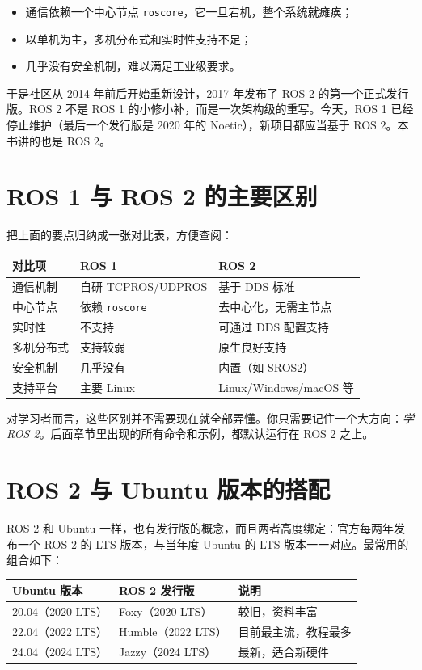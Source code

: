 \documentclass[12pt,a4paper]{ctexbook}
\begin{document}
\begin{itemize}
    \item 通信依赖一个中心节点 \texttt{roscore}，它一旦宕机，整个系统就瘫痪；
    \item 以单机为主，多机分布式和实时性支持不足；
    \item 几乎没有安全机制，难以满足工业级要求。
\end{itemize}

于是社区从 2014 年前后开始重新设计，2017 年发布了 ROS 2 的第一个正式发行版。ROS 2 不是 ROS 1 的小修小补，而是一次架构级的重写。今天，ROS 1 已经停止维护（最后一个发行版是 2020 年的 Noetic），新项目都应当基于 ROS 2。本书讲的也是 ROS 2。

\section{ROS 1 与 ROS 2 的主要区别}

把上面的要点归纳成一张对比表，方便查阅：

\begin{center}
\begin{tabular}{|l|l|l|}
\hline
\textbf{对比项} & \textbf{ROS 1} & \textbf{ROS 2} \\
\hline
通信机制 & 自研 TCPROS/UDPROS & 基于 DDS 标准 \\
中心节点 & 依赖 \texttt{roscore} & 去中心化，无需主节点 \\
实时性 & 不支持 & 可通过 DDS 配置支持 \\
多机分布式 & 支持较弱 & 原生良好支持 \\
安全机制 & 几乎没有 & 内置（如 SROS2） \\
支持平台 & 主要 Linux & Linux/Windows/macOS 等 \\
\hline
\end{tabular}
\end{center}

对学习者而言，这些区别并不需要现在就全部弄懂。你只需要记住一个大方向：\emph{学 ROS 2}。后面章节里出现的所有命令和示例，都默认运行在 ROS 2 之上。

\section{ROS 2 与 Ubuntu 版本的搭配}

ROS 2 和 Ubuntu 一样，也有发行版的概念，而且两者高度绑定：官方每两年发布一个 ROS 2 的 LTS 版本，与当年度 Ubuntu 的 LTS 版本一一对应。最常用的组合如下：

\begin{center}
\begin{tabular}{|l|l|l|}
\hline
\textbf{Ubuntu 版本} & \textbf{ROS 2 发行版} & \textbf{说明} \\
\hline
20.04（2020 LTS） & Foxy（2020 LTS） & 较旧，资料丰富 \\
22.04（2022 LTS） & Humble（2022 LTS） & 目前最主流，教程最多 \\
24.04（2024 LTS） & Jazzy（2024 LTS） & 最新，适合新硬件 \\
\hline
\end{tabular}
\end{center}
\end{document}
